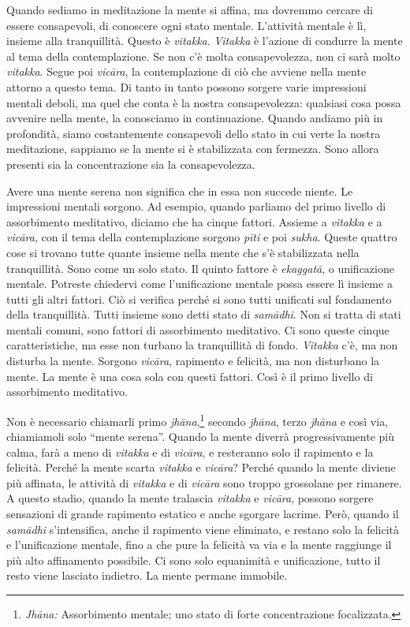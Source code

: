 Quando sediamo in meditazione la mente si affina, ma dovremmo cercare di
essere consapevoli, di conoscere ogni stato mentale. L'attività mentale
è lì, insieme alla tranquillità. Questo è \emph{vitakka}. \emph{Vitakka}
è l'azione di condurre la mente al tema della contemplazione. Se non c'è
molta consapevolezza, non ci sarà molto \emph{vitakka}. Segue poi
\emph{vicāra}, la contemplazione di ciò che avviene nella mente attorno
a questo tema. Di tanto in tanto possono sorgere varie impressioni
mentali deboli, ma quel che conta è la nostra consapevolezza: qualsiasi
cosa possa avvenire nella mente, la conosciamo in continuazione. Quando
andiamo più in profondità, siamo costantemente consapevoli dello stato
in cui verte la nostra meditazione, sappiamo se la mente si è
stabilizzata con fermezza. Sono allora presenti sia la concentrazione
sia la consapevolezza.

Avere una mente serena non significa che in essa non succede niente. Le
impressioni mentali sorgono. Ad esempio, quando parliamo del primo
livello di assorbimento meditativo, diciamo che ha cinque fattori.
Assieme a \emph{vitakka} e a \emph{vicāra}, con il tema della
contemplazione sorgono \emph{pīti} e poi \emph{sukha}. Queste quattro
cose si trovano tutte quante insieme nella mente che s'è stabilizzata
nella tranquillità. Sono come un solo stato. Il quinto fattore è
\emph{ekaggatā}, o unificazione mentale. Potreste chiedervi come
l'unificazione mentale possa essere lì insieme a tutti gli altri
fattori. Ciò si verifica perché si sono tutti unificati sul fondamento
della tranquillità. Tutti insieme sono detti stato di \emph{samādhi}.
Non si tratta di stati mentali comuni, sono fattori di assorbimento
meditativo. Ci sono queste cinque caratteristiche, ma esse non turbano
la tranquillità di fondo. \emph{Vitakka} c'è, ma non disturba la mente.
Sorgono \emph{vicāra}, rapimento e felicità, ma non disturbano la mente.
La mente è una cosa sola con questi fattori. Così è il primo livello di
assorbimento meditativo.

Non è necessario chiamarli primo \emph{jhāna},\footnote{\emph{Jhāna:}
  Assorbimento mentale; uno stato di forte concentrazione focalizzata.}
secondo \emph{jhāna}, terzo \emph{jhāna} e così via, chiamiamoli solo
``mente serena''. Quando la mente diverrà progressivamente più calma,
farà a meno di \emph{vitakka} e di \emph{vicāra}, e resteranno solo il
rapimento e la felicità. Perché la mente scarta \emph{vitakka} e
\emph{vicāra}? Perché quando la mente diviene più affinata, le attività
di \emph{vitakka} e di \emph{vicāra} sono troppo grossolane per
rimanere. A questo stadio, quando la mente tralascia \emph{vitakka} e
\emph{vicāra}, possono sorgere sensazioni di grande rapimento estatico e
anche sgorgare lacrime. Però, quando il \emph{samādhi} s'intensifica,
anche il rapimento viene eliminato, e restano solo la felicità e
l'unificazione mentale, fino a che pure la felicità va via e la mente
raggiunge il più alto affinamento possibile. Ci sono solo equanimità e
unificazione, tutto il resto viene lasciato indietro. La mente permane
immobile.

